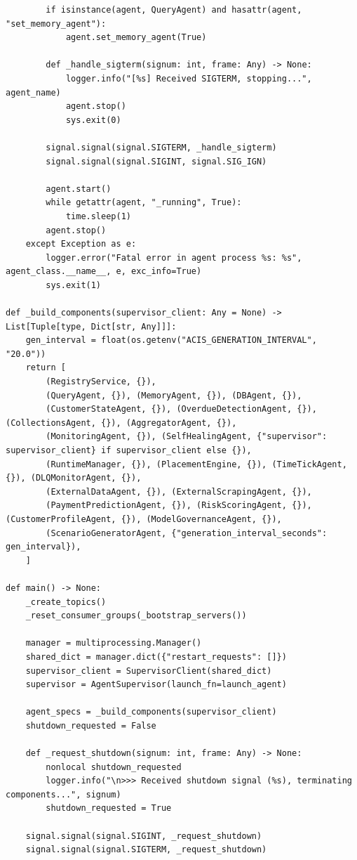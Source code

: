 \documentclass[a4paper, 12pt]{report}
\begin{document}
\begin{lstlisting}
        if isinstance(agent, QueryAgent) and hasattr(agent, "set_memory_agent"):
            agent.set_memory_agent(True)  

        def _handle_sigterm(signum: int, frame: Any) -> None:
            logger.info("[%s] Received SIGTERM, stopping...", agent_name)
            agent.stop()
            sys.exit(0)

        signal.signal(signal.SIGTERM, _handle_sigterm)
        signal.signal(signal.SIGINT, signal.SIG_IGN)

        agent.start()
        while getattr(agent, "_running", True):
            time.sleep(1)
        agent.stop()
    except Exception as e:
        logger.error("Fatal error in agent process %s: %s", agent_class.__name__, e, exc_info=True)
        sys.exit(1)

def _build_components(supervisor_client: Any = None) -> List[Tuple[type, Dict[str, Any]]]:
    gen_interval = float(os.getenv("ACIS_GENERATION_INTERVAL", "20.0"))
    return [
        (RegistryService, {}),
        (QueryAgent, {}), (MemoryAgent, {}), (DBAgent, {}),
        (CustomerStateAgent, {}), (OverdueDetectionAgent, {}), (CollectionsAgent, {}), (AggregatorAgent, {}),
        (MonitoringAgent, {}), (SelfHealingAgent, {"supervisor": supervisor_client} if supervisor_client else {}),
        (RuntimeManager, {}), (PlacementEngine, {}), (TimeTickAgent, {}), (DLQMonitorAgent, {}),
        (ExternalDataAgent, {}), (ExternalScrapingAgent, {}),
        (PaymentPredictionAgent, {}), (RiskScoringAgent, {}), (CustomerProfileAgent, {}), (ModelGovernanceAgent, {}),
        (ScenarioGeneratorAgent, {"generation_interval_seconds": gen_interval}),
    ]

def main() -> None:
    _create_topics()
    _reset_consumer_groups(_bootstrap_servers())

    manager = multiprocessing.Manager()
    shared_dict = manager.dict({"restart_requests": []})
    supervisor_client = SupervisorClient(shared_dict)
    supervisor = AgentSupervisor(launch_fn=launch_agent)

    agent_specs = _build_components(supervisor_client)
    shutdown_requested = False

    def _request_shutdown(signum: int, frame: Any) -> None:
        nonlocal shutdown_requested
        logger.info("\n>>> Received shutdown signal (%s), terminating components...", signum)
        shutdown_requested = True

    signal.signal(signal.SIGINT, _request_shutdown)
    signal.signal(signal.SIGTERM, _request_shutdown)


\end{lstlisting}
\end{document}
